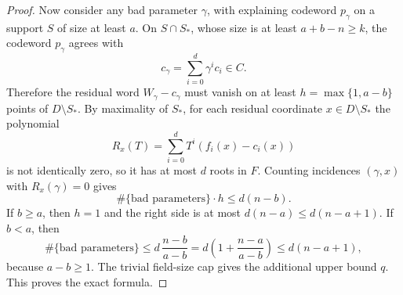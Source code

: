 \begin{proof}
Now consider any bad parameter \(\gamma\), with explaining codeword \(p_\gamma\)
on a support \(S\) of size at least \(a\).  On \(S\cap S_*\), whose size is at
least \(a+b-n\ge k\), the codeword \(p_\gamma\) agrees with
\[
  c_\gamma=\sum_{i=0}^d\gamma^i c_i\in C.
\]
Therefore the residual word \(W_\gamma-c_\gamma\) must vanish on at least
\(h=\max\{1,a-b\}\) points of \(D\setminus S_*\).  By maximality of \(S_*\), for
each residual coordinate \(x\in D\setminus S_*\) the polynomial
\[
  R_x(T)=\sum_{i=0}^d T^i(f_i(x)-c_i(x))
\]
is not identically zero, so it has at most \(d\) roots in \(F\).  Counting
incidences \((\gamma,x)\) with \(R_x(\gamma)=0\) gives
\[
  \#\{\text{bad parameters}\}\cdot h
  \le d(n-b).
\]
If \(b\ge a\), then \(h=1\) and the right side is at most
\(d(n-a)\le d(n-a+1)\).  If \(b<a\), then
\[
  \#\{\text{bad parameters}\}
  \le
  d\,\frac{n-b}{a-b}
  =
  d\left(1+\frac{n-a}{a-b}\right)
  \le d(n-a+1),
\]
because \(a-b\ge1\).  The trivial field-size cap gives the additional upper
bound \(q\).  This proves the exact formula.
\end{proof}
